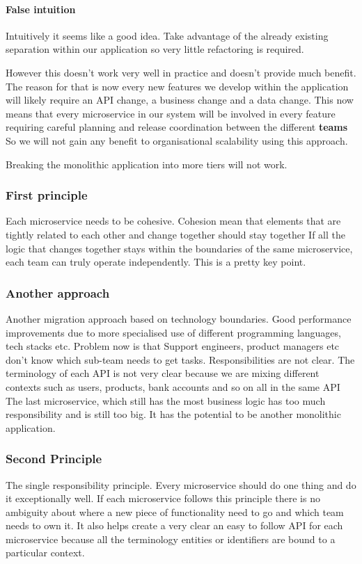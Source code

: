 \paragraph{False intuition}
Intuitively it seems like a good idea.
Take advantage of the already existing separation within our application so very little refactoring is required.

However this doesn't work very well in practice and doesn't provide much benefit.
The reason for that is now every new features we develop within the application will likely require an API change, a business change and a data change.
This now means that every microservice in our system will be involved in every feature requiring careful planning and release coordination between the different \textbf{teams}
So we will not gain any benefit to organisational scalability using this approach.

Breaking the monolithic application into more tiers will not work.

\subsubsection{First principle}
Each microservice needs to be cohesive.
Cohesion mean that elements that are tightly related to each other and change together should stay together
If all the logic that changes together stays within the boundaries of the same microservice, each team can truly operate independently. This is a pretty key point.

\subsubsection{Another approach}
Another migration approach based on technology boundaries.
Good performance improvements due to more specialised use of different programming languages, tech stacks etc.
Problem now is that Support engineers, product managers etc don't know which sub-team needs to get tasks.
Responsibilities are not clear.
The terminology of each API is not very clear because we are mixing different contexts such as users, products, bank accounts and so on all in the same API
The last microservice, which still has the most business logic has too much responsibility and is still too big.
It has the potential to be another monolithic application.

\subsubsection{Second Principle}
The single responsibility principle.
Every microservice should do one thing and do it exceptionally well.
If each microservice follows this principle there is no ambiguity about where a new piece of functionality need to go and which team needs to own it.
It also helps create a very clear an easy to follow API for each microservice because all the terminology entities or identifiers are bound to a particular context.

